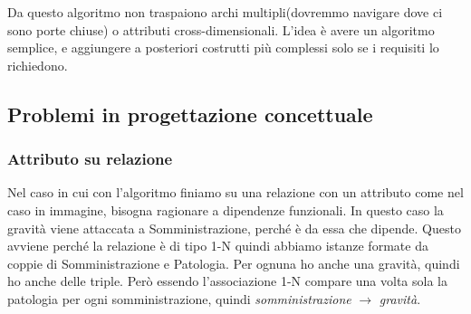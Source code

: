 \begin{warn}
	Da questo algoritmo non traspaiono archi multipli(dovremmo navigare dove ci sono porte chiuse) o attributi cross-dimensionali. L'idea è avere un algoritmo semplice, e aggiungere a posteriori costrutti più complessi solo se i requisiti lo richiedono.
\end{warn}
\subsection{Problemi in progettazione concettuale}
\subsubsection{Attributo su relazione}
Nel caso in cui con l'algoritmo finiamo su una relazione con un attributo come nel caso in immagine, bisogna ragionare a dipendenze funzionali. In questo caso la gravità viene attaccata a Somministrazione, perché è da essa che dipende. Questo avviene perché la relazione è di tipo 1-N quindi abbiamo istanze formate da coppie di Somministrazione e Patologia. Per ognuna ho anche una gravità, quindi ho anche delle triple. Però essendo l'associazione 1-N compare una volta sola la patologia per ogni somministrazione, quindi \textit{somministrazione} $\xrightarrow{}$ \textit{gravità}.
